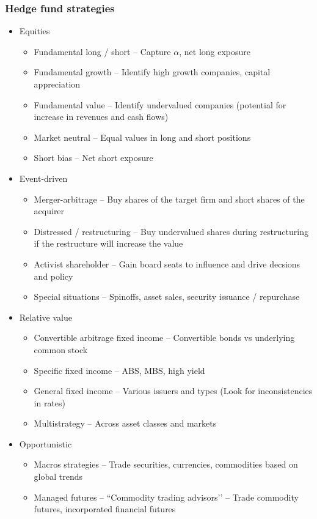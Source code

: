 \documentclass[../notes_compiled.tex]{subfiles}
\begin{document}
\subsubsection{Hedge fund strategies}
\begin{itemize}
\item Equities
\begin{itemize}
\item Fundamental long / short -- Capture $\alpha$, net long exposure
\item Fundamental growth -- Identify high growth companies, capital appreciation
\item Fundamental value -- Identify undervalued companies (potential for increase in revenues and cash flows)
\item Market neutral -- Equal values in long and short positions
\item Short bias -- Net short exposure
\end{itemize}
\item Event-driven
\begin{itemize}
\item Merger-arbitrage -- Buy shares of the target firm and short shares of the acquirer
\item Distressed / restructuring -- Buy undervalued shares during restructuring if the restructure will increase the value
\item Activist shareholder -- Gain board seats to influence and drive decsions and policy
\item Special situations -- Spinoffs, asset sales, security issuance / repurchase
\end{itemize}
\item Relative value
\begin{itemize}
\item Convertible arbitrage fixed income -- Convertible bonds vs underlying common stock
\item Specific fixed income -- ABS, MBS, high yield
\item General fixed income -- Various issuers and types (Look for inconsistencies in rates)
\item Multistrategy -- Across asset classes and markets
\end{itemize}
\item Opportunistic
\begin{itemize}
\item Macros strategies -- Trade securities, currencies, commodities based on global trends
\item Managed futures -- ``Commodity trading advisors’’ -- Trade commodity futures, incorporated financial futures
\end{itemize}
\end{itemize}
\end{document}
